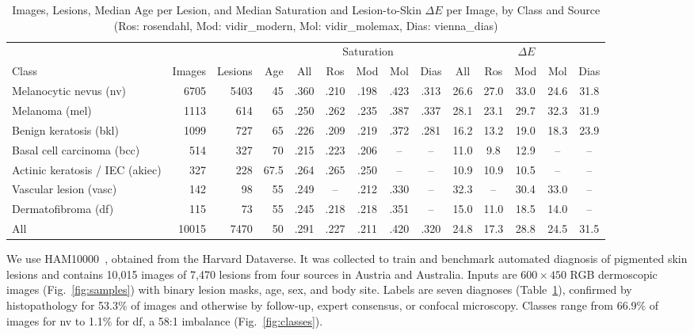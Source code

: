 

\begin{table}[t]
\caption{Images, Lesions, Median Age per Lesion, and Median Saturation and Lesion-to-Skin $\Delta E$ per Image, by Class and Source (Ros: rosendahl, Mod: vidir\_modern, Mol: vidir\_molemax, Dias: vienna\_dias)}
\label{tab:classes}
\centering
\footnotesize
\begin{tabular}{lrrr|ccccc|ccccc}
\hline
& & & & \multicolumn{5}{c|}{Saturation} & \multicolumn{5}{c}{$\Delta E$} \\
Class & Images & Lesions & Age & All & Ros & Mod & Mol & Dias & All & Ros & Mod & Mol & Dias \\
\hline
Melanocytic nevus (nv) & 6705 & 5403 & 45 & .360 & .210 & .198 & .423 & .313 & 26.6 & 27.0 & 33.0 & 24.6 & 31.8 \\
Melanoma (mel) & 1113 & 614 & 65 & .250 & .262 & .235 & .387 & .337 & 28.1 & 23.1 & 29.7 & 32.3 & 31.9 \\
Benign keratosis (bkl) & 1099 & 727 & 65 & .226 & .209 & .219 & .372 & .281 & 16.2 & 13.2 & 19.0 & 18.3 & 23.9 \\
Basal cell carcinoma (bcc) & 514 & 327 & 70 & .215 & .223 & .206 & -- & -- & 11.0 & 9.8 & 12.9 & -- & -- \\
Actinic keratosis / IEC (akiec) & 327 & 228 & 67.5 & .264 & .265 & .250 & -- & -- & 10.9 & 10.9 & 10.5 & -- & -- \\
Vascular lesion (vasc) & 142 & 98 & 55 & .249 & -- & .212 & .330 & -- & 32.3 & -- & 30.4 & 33.0 & -- \\
Dermatofibroma (df) & 115 & 73 & 55 & .245 & .218 & .218 & .351 & -- & 15.0 & 11.0 & 18.5 & 14.0 & -- \\
\hline
All & 10015 & 7470 & 50 & .291 & .227 & .211 & .420 & .320 & 24.8 & 17.3 & 28.8 & 24.5 & 31.5 \\
\hline
\end{tabular}
\end{table}

We use HAM10000~\cite{b2}, obtained from the Harvard Dataverse. It was collected to train and benchmark automated diagnosis of pigmented skin lesions and contains 10,015 images of 7,470 lesions from four sources in Austria and Australia.
Inputs are $600\times450$ RGB dermoscopic images (Fig.~\ref{fig:samples}) with binary lesion masks, age, sex, and body site.
Labels are seven diagnoses (Table~\ref{tab:classes}), confirmed by histopathology for 53.3\% of images and otherwise by follow-up, expert consensus, or confocal microscopy.
Classes range from 66.9\% of images for nv to 1.1\% for df, a 58:1 imbalance (Fig.~\ref{fig:classes}).

